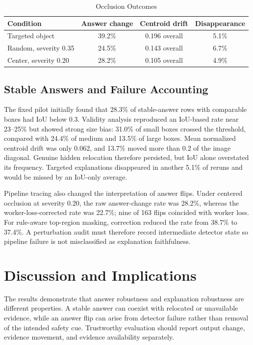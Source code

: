 \documentclass[12pt,letterpaper,twoside]{article}
\begin{document}
\begin{table}[htbp]
\centering
\caption{Occlusion Outcomes}
\label{tab:occlusion}
\begin{tabular}{@{}lccc@{}}
\toprule
Condition & Answer change & Centroid drift & Disappearance \\
\midrule
Targeted object & 39.2\% & 0.196 overall & 5.1\% \\
Random, severity 0.35 & 24.5\% & 0.143 overall & 6.7\% \\
Center, severity 0.20 & 28.2\% & 0.105 overall & 4.9\% \\
\bottomrule
\end{tabular}
\end{table}

\subsection{Stable Answers and Failure Accounting}

The fixed pilot initially found that 28.3\% of stable-answer rows with comparable boxes had IoU below 0.3. Validity analysis reproduced an IoU-based rate near 23--25\% but showed strong size bias: 31.0\% of small boxes crossed the threshold, compared with 24.4\% of medium and 13.5\% of large boxes. Mean normalized centroid drift was only 0.062, and 13.7\% moved more than 0.2 of the image diagonal. Genuine hidden relocation therefore persisted, but IoU alone overstated its frequency. Targeted explanations disappeared in another 5.1\% of reruns and would be missed by an IoU-only average.

Pipeline tracing also changed the interpretation of answer flips. Under centered occlusion at severity 0.20, the raw answer-change rate was 28.2\%, whereas the worker-loss-corrected rate was 22.7\%; nine of 163 flips coincided with worker loss. For rule-aware top-region masking, correction reduced the rate from 38.7\% to 37.4\%. A perturbation audit must therefore record intermediate detector state so pipeline failure is not misclassified as explanation faithfulness.

\section{Discussion and Implications}

The results demonstrate that answer robustness and explanation robustness are different properties. A stable answer can coexist with relocated or unavailable evidence, while an answer flip can arise from detector failure rather than removal of the intended safety cue. Trustworthy evaluation should report output change, evidence movement, and evidence availability separately.
\end{document}
